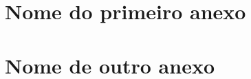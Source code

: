 
\begin{anexosenv}

\partanexos

\chapter{Nome do primeiro anexo}
\lipsum[30] %

\chapter{Nome de outro anexo}

\lipsum[32] %

\end{anexosenv}